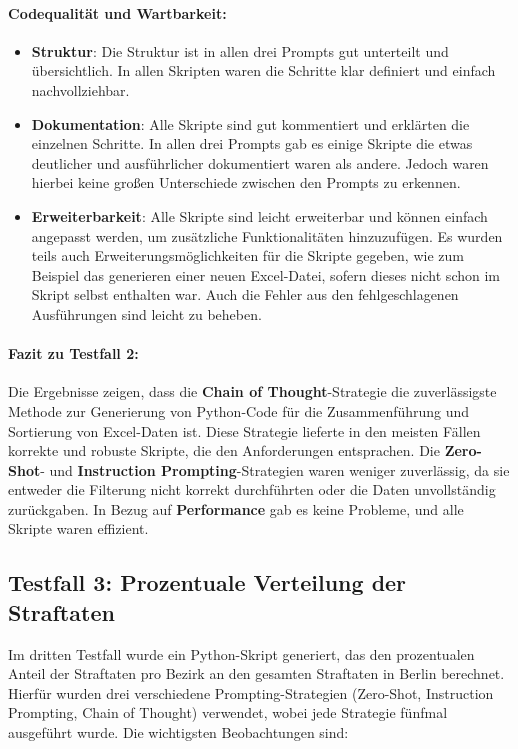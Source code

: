 \documentclass[11pt,a4paper]{article}
\begin{document}
\paragraph{Codequalität und Wartbarkeit:}
\begin{itemize}
    \item \textbf{Struktur}: Die Struktur ist in allen drei Prompts gut unterteilt und übersichtlich. In allen Skripten waren die Schritte klar definiert und einfach nachvollziehbar.
    \item \textbf{Dokumentation}: Alle Skripte sind gut kommentiert und erklärten die einzelnen Schritte. In allen drei Prompts gab es einige Skripte die etwas deutlicher und ausführlicher dokumentiert waren als andere. Jedoch waren hierbei keine großen Unterschiede zwischen den Prompts zu erkennen.
    \item \textbf{Erweiterbarkeit}: Alle Skripte sind leicht erweiterbar und können einfach angepasst werden, um zusätzliche Funktionalitäten hinzuzufügen. Es wurden teils auch Erweiterungsmöglichkeiten für die Skripte gegeben, wie zum Beispiel das generieren einer neuen Excel-Datei, sofern dieses nicht schon im Skript selbst enthalten war. Auch die Fehler aus den fehlgeschlagenen Ausführungen sind leicht zu beheben.
\end{itemize}

\paragraph{Fazit zu Testfall 2:}
Die Ergebnisse zeigen, dass die \textbf{Chain of Thought}-Strategie die zuverlässigste Methode zur Generierung von Python-Code für die Zusammenführung und Sortierung von Excel-Daten ist. Diese Strategie lieferte in den meisten Fällen korrekte und robuste Skripte, die den Anforderungen entsprachen. Die \textbf{Zero-Shot}- und \textbf{Instruction Prompting}-Strategien waren weniger zuverlässig, da sie entweder die Filterung nicht korrekt durchführten oder die Daten unvollständig zurückgaben. In Bezug auf \textbf{Performance} gab es keine Probleme, und alle Skripte waren effizient.

\subsection{Testfall 3: Prozentuale Verteilung der Straftaten}
\label{subsec:auswertung_testfall3}

Im dritten Testfall wurde ein Python-Skript generiert, das den prozentualen Anteil der Straftaten pro Bezirk an den gesamten Straftaten in Berlin berechnet. Hierfür wurden drei verschiedene Prompting-Strategien (Zero-Shot, Instruction Prompting, Chain of Thought) verwendet, wobei jede Strategie fünfmal ausgeführt wurde. Die wichtigsten Beobachtungen sind:
\end{document}
